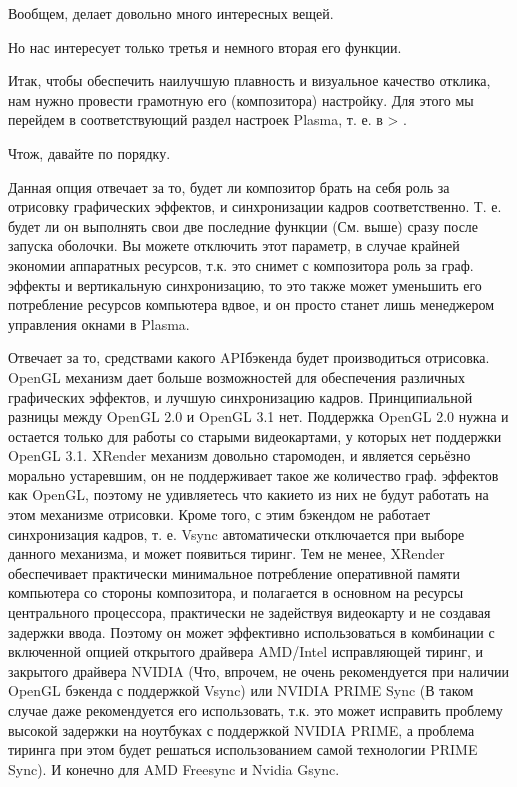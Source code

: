 \documentclass[letterpaper,10pt,russian,openany]{sphinxmanual}
\begin{document}
\sphinxAtStartPar
Вообщем, делает довольно много интересных вещей.

\sphinxAtStartPar
Но нас интересует только третья и немного вторая его функции.

\sphinxAtStartPar
Итак, чтобы обеспечить наилучшую плавность и визуальное качество отклика, нам нужно провести грамотную его (композитора) настройку.
Для этого мы перейдем в соответствующий раздел настроек Plasma, т. е. в  \sphinxhyphen{}> .

\noindent{}

\sphinxAtStartPar
Что\sphinxhyphen{}ж, давайте по порядку.

\sphinxAtStartPar
{}

\sphinxAtStartPar
Данная опция отвечает за то, будет ли композитор брать на себя роль за отрисовку графических эффектов, и синхронизации кадров соответственно.
Т. е. будет ли он выполнять свои две последние функции (См. выше) сразу после запуска оболочки.
Вы можете отключить этот параметр, в случае крайней экономии аппаратных ресурсов,
т.к. это снимет с композитора роль за граф. эффекты и вертикальную синхронизацию,
то это также может уменьшить его потребление ресурсов компьютера вдвое,
и он просто станет лишь менеджером управления окнами в Plasma.

\sphinxAtStartPar
{}

\sphinxAtStartPar
Отвечает за то, средствами какого API\sphinxhyphen{}бэкенда будет производиться отрисовка.
OpenGL механизм дает больше возможностей для обеспечения различных графических эффектов, и лучшую синхронизацию кадров.
Принципиальной разницы между OpenGL 2.0 и OpenGL 3.1 \sphinxhyphen{} нет.
Поддержка OpenGL 2.0 нужна и остается только для работы со старыми видеокартами, у которых нет поддержки OpenGL 3.1.
XRender механизм довольно старомоден, и является серьёзно морально устаревшим, он не поддерживает такое же количество граф. эффектов как OpenGL,
поэтому не удивляетесь что какие\sphinxhyphen{}то из них не будут работать на этом механизме отрисовки.
Кроме того, с этим бэкендом не работает синхронизация кадров, т. е. Vsync автоматически отключается при выборе данного механизма, и может появиться тиринг.
Тем не менее, XRender обеспечивает практически минимальное потребление оперативной памяти компьютера со стороны композитора,
и полагается в основном на ресурсы центрального процессора, практически не задействуя видеокарту и не создавая задержки ввода.
Поэтому он может эффективно использоваться в комбинации с включенной  опцией открытого драйвера AMD/Intel исправляющей тиринг,
и   закрытого драйвера NVIDIA
(Что, впрочем, не очень рекомендуется при наличии OpenGL бэкенда с поддержкой Vsync) или NVIDIA PRIME Sync
(В таком случае даже рекомендуется его использовать, т.к. это может исправить проблему высокой задержки на ноутбуках с поддержкой NVIDIA PRIME,
а проблема тиринга при этом будет решаться использованием самой технологии PRIME Sync).
И конечно для AMD Freesync и Nvidia Gsync.
\end{document}

